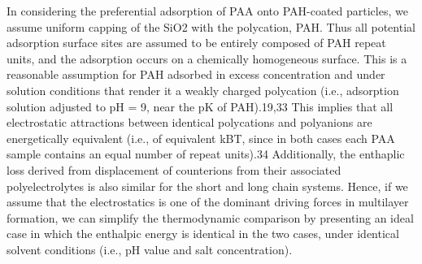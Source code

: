 \documentclass[journal=jacsat,manuscript=article]{achemso}
\begin{document}
In considering the preferential adsorption of PAA onto PAH-coated particles, we assume uniform capping of the SiO2 with the polycation, PAH.  Thus all potential adsorption surface sites are assumed to be entirely composed of PAH repeat units, and the adsorption occurs on a chemically homogeneous surface.  This is a reasonable assumption for PAH adsorbed in excess concentration and under solution conditions that render it a weakly charged polycation (i.e., adsorption solution adjusted to pH = 9, near the pK of PAH).19,33  This implies that all electrostatic attractions between identical polycations and polyanions are energetically equivalent (i.e., of equivalent kBT, since in both cases each PAA sample contains an equal number of repeat units).34  Additionally, the enthaplic loss derived from displacement of counterions from their associated polyelectrolytes is also similar for the short and long chain systems.  Hence, if we assume that the electrostatics is one of the dominant driving forces in multilayer formation, we can simplify the thermodynamic comparison by presenting an ideal case in which the enthalpic energy is identical in the two cases, under identical solvent conditions (i.e., pH value and salt concentration). 
\end{document}

